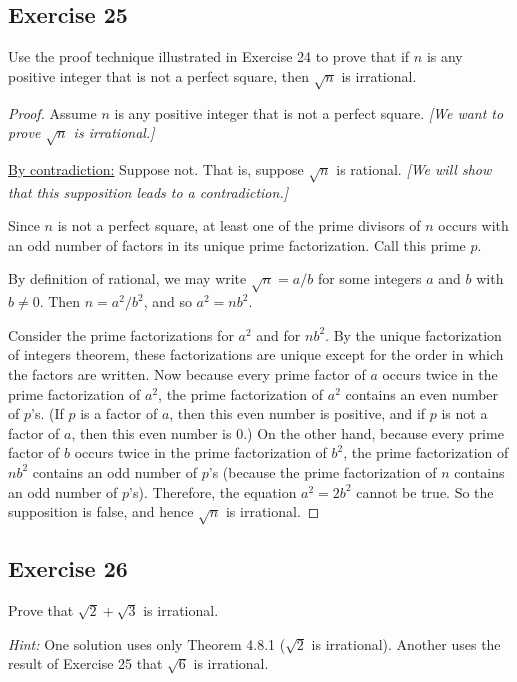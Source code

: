 \documentclass[14pt]{extarticle}
\begin{document}
\subsection{Exercise 25}
Use the proof technique illustrated in Exercise 24 to prove that if $n$ is any positive integer that is not a perfect square, then $\sqrt{n}$ is irrational.

\begin{proof}
Assume $n$ is any positive integer that is not a perfect square. {\it [We want to prove $\sqrt{n}$ is irrational.]}

\underline{By contradiction:} Suppose not. That is, suppose
$\sqrt{n}$ is rational. {\it [We will show that this supposition leads to a contradiction.]} 

Since $n$ is not a perfect square, at least one of the prime divisors of $n$ occurs with an odd number of factors in its unique prime factorization. Call this prime $p$.

By definition of rational, we may write $\sqrt{n} = a/b$ for some integers $a$ and $b$ with $b \neq 0$. Then $n = a^2/b^2$, and so $a^2 = nb^2$. 

Consider the prime factorizations for $a^2$ and for $nb^2$. By the unique factorization of integers theorem, these factorizations are unique except for the order in which the factors are written. Now because every prime factor of $a$ occurs twice in the prime factorization of $a^2$, the prime factorization of $a^2$ contains an even number of $p$’s. (If $p$ is a factor of $a$, then this even number is positive, and if $p$ is not a factor of $a$, then this even number is 0.) On the other hand, because every prime factor of $b$ occurs twice in the prime factorization of $b^2$, the prime factorization of $nb^2$ contains an odd number of $p$’s (because the prime factorization of $n$ contains an odd number of $p$'s). Therefore, the equation $a^2 = 2b^2$ cannot be true. So the supposition is false, and hence $\sqrt{n}$ is irrational.
\end{proof}

\subsection{Exercise 26}
Prove that $\sqrt{2} + \sqrt{3}$ is irrational.

{\it Hint:} One solution uses only Theorem 4.8.1 ($\sqrt{2}$ is irrational). Another uses the result of Exercise 25 that $\sqrt{6}$ is irrational.
\end{document}
